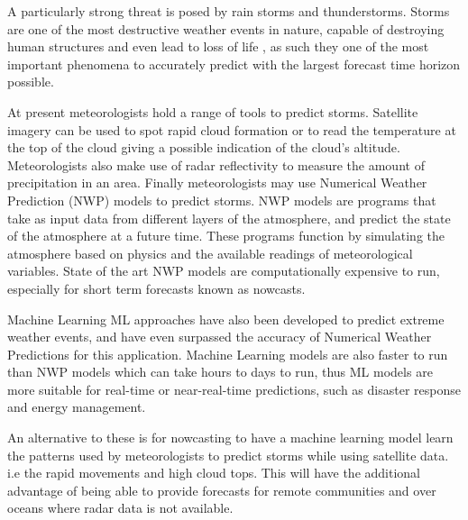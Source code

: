 \documentclass[acmtog, authorversion]{acmart}
\begin{document}
A particularly strong threat is posed by rain storms and thunderstorms. Storms are one of the most destructive weather events in nature, capable of destroying human structures and even lead to loss of life \cite{noaa-national-severe-storms-laboratory-no-date}, as such they one of the most important phenomena to accurately predict with the largest forecast time horizon possible.

At present meteorologists hold a range of tools to predict storms. Satellite imagery can be used to spot rapid cloud formation or to read the temperature at the top of the cloud giving a possible indication of the cloud's altitude. Meteorologists also make use of radar reflectivity to measure the amount of precipitation in an area. Finally meteorologists may use Numerical Weather Prediction (\textsc{NWP}) models to predict storms. \textsc{NWP} models are programs that take as input data from different layers of the atmosphere, and predict the state of the atmosphere at a future time. These programs function by simulating the atmosphere based on physics and the available readings of meteorological variables. State of the art \textsc{NWP} models are computationally expensive to run, especially for short term forecasts known as nowcasts.

Machine Learning \textsc{ML} approaches have also been developed to predict extreme weather events, and have even surpassed the accuracy of Numerical Weather Predictions for this application. Machine Learning models are also faster to run than \textsc{NWP} models which can take hours to days to run, thus ML models are more suitable for real-time or near-real-time predictions, such as disaster response and energy management.

An alternative to these is for nowcasting to have a machine learning model learn the patterns used by meteorologists to predict storms while using satellite data. i.e the rapid movements and high cloud tops. This will have the additional advantage of being able to provide forecasts for remote communities and over oceans where radar data is not available.

\end{document}
